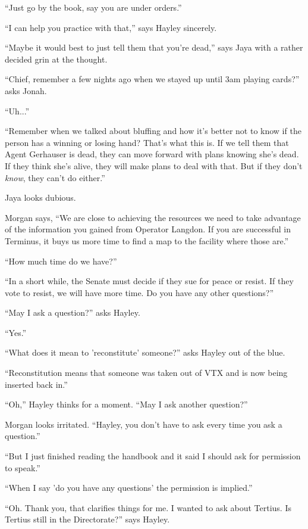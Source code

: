 ``Just go by the book, say you are under orders.''

``I can help you practice with that,'' says Hayley sincerely.

``Maybe it would best to just tell them that you're dead,'' says Jaya with a rather decided grin at the thought.

``Chief, remember a few nights ago when we stayed up until 3am playing cards?'' asks Jonah.

``Uh...''

``Remember when we talked about bluffing and how it's better not to know if the person has a winning or losing hand?  That's what this is.  If we tell them that Agent Gerhauser is dead, they can move forward with plans knowing she's dead.  If they think she's alive, they will make plans to deal with that. But if they don't \textit{know}, they can't do either.''

Jaya looks dubious.

Morgan says, ``We are close to achieving the resources we need to take advantage of the information you gained from Operator Langdon.  If you are successful in Terminus, it buys us more time to find a map to the facility where those are.''

``How much time do we have?''

``In a short while, the Senate must decide if they sue for peace or resist.  If they vote to resist, we will have more time.  Do you have any other questions?''

``May I ask a question?'' asks Hayley.

``Yes.''

``What does it mean to 'reconstitute' someone?'' asks Hayley out of the blue.

``Reconstitution means that someone was taken out of VTX and is now being inserted back in.'' 

``Oh,''  Hayley thinks for a moment.  ``May I ask another question?''

Morgan looks irritated.  ``Hayley, you don't have to ask every time you ask a question.''

``But I just finished reading the handbook and it said I should ask for permission to speak.''

``When I say 'do you have any questions' the permission is implied.''

``Oh.  Thank you, that clarifies things for me.  I wanted to ask about Tertius.  Is Tertius still in the Directorate?'' says Hayley.

